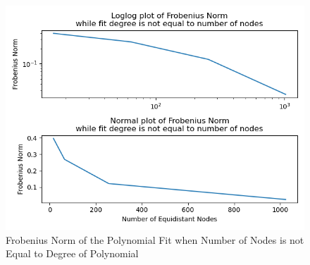 \documentclass[letterpaper,12pt]{article}
\begin{document}
\begin{figure}[H]
    \centerline{\includegraphics[width=\linewidth]{figures/frobpolynenodes.png}}
    \caption{Frobenius Norm of the Polynomial Fit when Number of Nodes is not Equal to Degree of Polynomial}
    \label{fig:frobpolynenodes}
    \end{figure}
    

    

    
    
\end{document}
